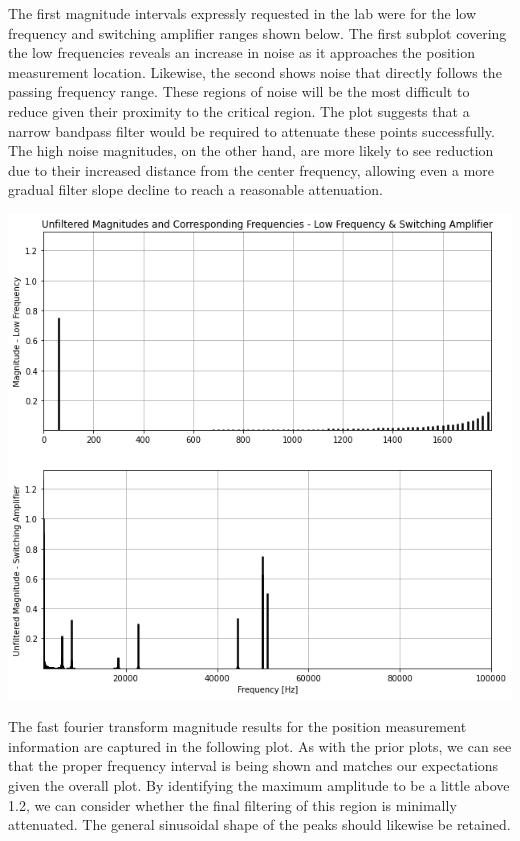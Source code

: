 \documentclass[12pt]{report}
\begin{document}
The first magnitude intervals expressly requested in the lab were for the low frequency and switching amplifier ranges shown below. The first subplot covering the low frequencies reveals an increase in noise as it approaches the position measurement location. Likewise, the second shows noise that directly follows the passing frequency range. These regions of noise will be the most difficult to reduce given their proximity to the critical region. The plot suggests that a narrow bandpass filter would be required to attenuate these points successfully. The high noise magnitudes, on the other hand, are more likely to see reduction due to their increased distance from the center frequency, allowing even a more gradual filter slope decline to reach a reasonable attenuation. \\

\begin{center}
	\includegraphics[scale = 0.6]{Lab 12 - Plots/Unfiltered FFT2.png}\\[1.0 cm]
\end{center}

The fast fourier transform magnitude results for the position measurement information are captured in the following plot. As with the prior plots, we can see that the proper frequency interval is being shown and matches our expectations given the overall plot. By identifying the maximum amplitude to be a little above 1.2, we can consider whether the final filtering of this region is minimally attenuated. The general sinusoidal shape of the peaks should likewise be retained. \\
\end{document}
